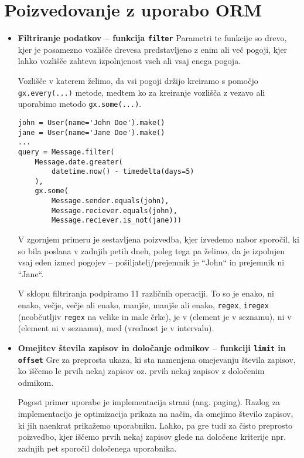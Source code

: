 \documentclass[a4paper,12pt,openright]{book}
\begin{document}
    \section{Poizvedovanje z uporabo ORM}
    \begin{itemize}
        \item \textbf{Filtriranje podatkov – funkcija {\tt filter}}
        \newline
        \noindent
        Parametri te funkcije so drevo, kjer je posamezno vozlišče drevesa predstavljeno z enim ali več pogoji, kjer lahko vozlišče zahteva izpolnjenost vseh ali vsaj enega pogoja.
        
        Vozlišče v katerem želimo, da vsi pogoji držijo kreiramo s pomočjo {\tt gx.every(...)} metode, medtem ko za kreiranje vozlišča z vezavo ali uporabimo metodo {\tt gx.some(...)}.
        
\begin{verbatim}
john = User(name='John Doe').make()
jane = User(name='Jane Doe').make()
...
query = Message.filter(
    Message.date.greater(
        datetime.now() - timedelta(days=5)
    ),
    gx.some(
        Message.sender.equals(john),
        Message.reciever.equals(john),
        Message.reciever.is_not(jane)))
\end{verbatim}    

        \noindent
        V zgornjem primeru je sestavljena poizvedba, kjer izvedemo nabor sporočil, ki so bila poslana v zadnjih petih dneh, poleg tega pa želimo, da je izpolnjen vsaj eden izmed pogojev – pošiljatelj/prejemnik je ``John`` in prejemnik ni ``Jane``.

        V sklopu filtriranja podpiramo 11 različnih operaciji. To so je enako, ni enako, večje, večje ali enako, manjše, manjše ali enako, {\tt regex}, {\tt iregex} (neobčutljiv {\tt regex} na velike in male črke), je v (element je v seznamu), ni v (element ni v seznamu), med (vrednost je v intervalu).
        
        \item \textbf{Omejitev števila zapisov in določanje odmikov – funkciji {\tt limit} in {\tt offset}}
        \newline
        \noindent
        Gre za preprosta ukaza, ki sta namenjena omejevanju števila zapisov, ko iščemo le prvih nekaj zapisov oz. prvih nekaj zapisov z določenim odmikom. 

        Pogost primer uporabe je implementacija strani (ang. paging). Razlog za implementacijo je optimizacija prikaza na način, da omejimo število zapisov, ki jih naenkrat prikažemo uporabniku. Lahko, pa gre tudi za čisto preprosto poizvedbo, kjer iščemo prvih nekaj zapisov glede na določene kriterije npr. zadnjih pet sporočil določenega uporabnika.
        

\end{itemize}
\end{document}
